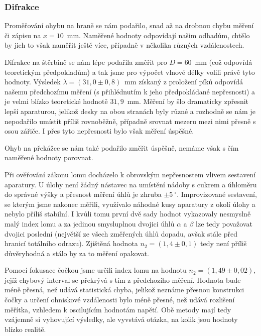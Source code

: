 \documentclass[english]{article}
\begin{document}
			\subsubsection{Difrakce}
					Proměřování ohybu na hraně se nám podařilo, snad až na drobnou chybu měření či zápisu na $x=10$~mm. Naměřené hodnoty odpovídají našim odhadům, chtělo by jich to však naměřit ještě více, případně v několika  různých vzdálenostech. 
					
					Difrakce na štěrbině se nám lépe podařila změřit pro $D=60$~mm (což odpovídá teoretickým předpokladům) a tak jsme pro výpočet vlnové délky volili právě tyto hodnoty. Výsledek $\lambda=(31,0\pm0,8)$~mm získaný z proložení píků odpovídá našemu předchozímu měření (s přihlédnutím k jeho předpokládané nepřesnosti) a je velmi blízko teoretické hodnotě $31,9$~mm. Měření by šlo dramaticky zpřesnit lepší aparaturou, jelikož desky na obou stranách byly různé a rozhodně se nám je nepodařilo umístit příliš rovnoběžně, případně srovnat mezeru mezi nimi přesně s osou zářiče. I přes tyto nepřesnosti bylo však měření úspěšné.
					
					Ohyb na překážce se nám také podařilo změřit úspěšně, nemáme však s čím naměřené hodnoty porovnat. 
					
					Při ověřování zákonu lomu docházelo k obrovským nepřesnostem vlivem sestavení aparatury. U úlohy není žádný nástavec na umístění nádoby s cukrem a úhloměru do správné výšky a přesnost měření úhlů je zhruba $\pm5~^\circ$. Improvizované sestavení, se kterým jsme nakonec měřili, využívalo náhodné kusy aparatury z okolí úlohy a nebylo příliš stabilní. I kvůli tomu první dvě sady hodnot vykazovaly nesmyslně malý index lomu a za jedinou smysluplnou dvojici úhlů $\alpha$ a $\beta$ lze tedy považovat dvojici poslední (největší ze všech změřených úhlů dopadu, avšak stále před hranicí totálního odrazu). Zjištěná hodnota $n_2=(1,4\pm0,1)$  tedy není příliš důvěryhodná a stálo by za to měření opakovat.
					
					Pomocí fokusace čočkou jsme určili index lomu na hodnotu $n_2=(1,49\pm0,02)$, jejíž chybový interval se překrývá s tím z předchozího měření. Hodnota bude méně přesná, než udává statistická chyba, jelikož neznáme přesnou konstrukci čočky a určení ohniskové vzdálenosti bylo méně přesné, než udává rozlišení měřítka, vzhledem k oscilujícím hodnotám napětí. Obě metody mají tedy vzájemně si vyhovující výsledky, ale vyvstává otázka, na kolik jsou hodnoty blízko realitě.
					
\end{document}
